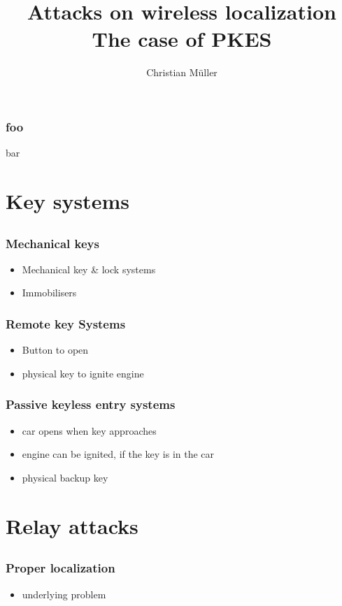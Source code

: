\documentclass[12pt]{beamer}
\title{Attacks on wireless localization\\ The case of PKES}
\author{Christian Müller}
\begin{document}
	\begin{frame}
		\titlepage
	\end{frame}

	\begin{frame}
		\tableofcontents
	\end{frame}

	\begin{frame}
		\frametitle{foo}
		bar
	\end{frame}
	
\section{Key systems}
\subsection*{}
	\begin{frame}
		\frametitle{Mechanical keys}
		\begin{itemize}
			\onslide<1-2>			
			\item Mechanical key \& lock systems
			\onslide<2-2>
			\item Immobilisers
		\end{itemize}
	\end{frame}
	
	\begin{frame}
		\frametitle{Remote key Systems}
		\begin{itemize}
			\item Button to open
			\item physical key to ignite engine
		\end{itemize}
	\end{frame}

	\begin{frame}
		\frametitle{Passive keyless entry systems}
		\begin{itemize}
			\item car opens when key approaches
			\item engine can be ignited, if the key is in the car
			\item physical backup key
		\end{itemize}
	\end{frame}

\section{Relay attacks}
\subsection*{}
	\begin{frame}
	\frametitle{Proper localization}
		\begin{itemize}
			\item underlying problem
		\end{itemize}
	\end{frame}
	
\end{document}
